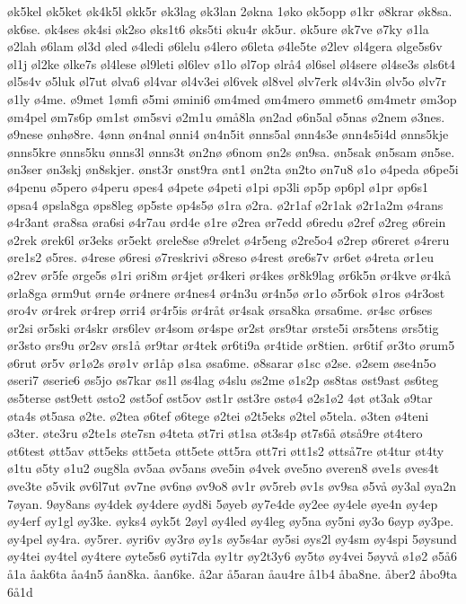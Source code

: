{øk5kel
øk5ket
øk4k5l
økk5r
øk3lag
øk3lan
2økna
1øko
øk5opp
ø1kr
ø8krar
øk8sa.
øk6se.
øk4ses
øk4si
øk2so
øks1t6
øks5ti
øku4r
øk5ur.
øk5ure
øk7ve
ø7ky
ø1la
ø2lah
ø6lam
øl3d
øled
ø4ledi
ø6lelu
ø4lero
ø6leta
ø4le5te
ø2lev
øl4gera
ølge5s6v
øl1j
øl2ke
ølke7s
øl4lese
øl9leti
øl6lev
ø1lo
øl7op
ølrå4
øl6sel
øl4sere
øl4se3s
øls6t4
øl5s4v
ø5luk
øl7ut
ølva6
øl4var
øl4v3ei
øl6vek
øl8vel
ølv7erk
øl4v3in
ølv5o
ølv7r
ø1ly
ø4me.
ø9met
1ømfi
ø5mi
ømini6
øm4med
øm4mero
ømmet6
øm4metr
øm3op
øm4pel
øm7s6p
øm1st
øm5svi
ø2m1u
ømå8la
øn2ad
ø6n5al
ø5nas
ø2nem
ø3nes.
ø9nese
ønhø8re.
4ønn
øn4nal
ønni4
øn4n5it
ønns5al
ønn4s3e
ønn4s5i4d
ønns5kje
ønns5kre
ønns5ku
ønns3l
ønns3t
øn2nø
ø6nom
øn2s
øn9sa.
øn5sak
øn5sam
øn5se.
øn3ser
øn3skj
øn8skjer.
ønst3r
ønst9ra
ønt1
øn2ta
øn2to
øn7u8
ø1o
ø4peda
ø6pe5i
ø4penu
ø5pero
ø4peru
øpes4
ø4pete
ø4peti
ø1pi
øp3li
øp5p
øp6pl
ø1pr
øp6s1
øpsa4
øpsla8ga
øps8leg
øp5ste
øp4s5ø
ø1ra
ø2ra.
ø2r1af
ø2r1ak
ø2r1a2m
ø4rans
ø4r3ant
øra8sa
øra6si
ø4r7au
ørd4e
ø1re
ø2rea
ør7edd
ø6redu
ø2ref
ø2reg
ø6rein
ø2rek
ørek6l
ør3eks
ør5ekt
ørele8se
ø9relet
ø4r5eng
ø2re5o4
ø2rep
ø6reret
ø4reru
øre1s2
ø5res.
ø4rese
ø6resi
ø7reskrivi
ø8reso
ø4rest
øre6s7v
ør6et
ø4reta
ør1eu
ø2rev
ør5fe
ørge5s
ø1ri
øri8m
ør4jet
ør4keri
ør4kes
ør8k9lag
ør6k5n
ør4kve
ør4kå
ørla8ga
ørm9ut
ørn4e
ør4nere
ør4nes4
ør4n3u
ør4n5ø
ør1o
ø5r6ok
ø1ros
ø4r3ost
øro4v
ør4rek
ør4rep
ørri4
ør4r5is
ør4råt
ør4sak
ørsa8ka
ørsa6me.
ør4sc
ør6ses
ør2si
ør5ski
ør4skr
ørs6lev
ør4som
ør4spe
ør2st
ørs9tar
ørste5i
ørs5tens
ørs5tig
ør3sto
ørs9u
ør2sv
ørs1å
ør9tar
ør4tek
ør6ti9a
ør4tide
ør8tien.
ør6tif
ør3to
ørum5
ø6rut
ør5v
ør1ø2s
ørø1v
ør1åp
ø1sa
øsa6me.
ø8sarar
ø1sc
ø2se.
ø2sem
øse4n5o
øseri7
øserie6
øs5jo
øs7kar
øs1l
øs4lag
ø4slu
øs2me
ø1s2p
øs8tas
øst9ast
øs6teg
øs5terse
øst9ett
østo2
øst5of
øst5ov
øst1r
øst3re
østø4
ø2s1ø2
4øt
øt3ak
ø9tar
øta4s
øt5asa
ø2te.
ø2tea
ø6tef
ø6tege
ø2tei
ø2t5eks
ø2tel
ø5tela.
ø3ten
ø4teni
ø3ter.
øte3ru
ø2te1s
øte7sn
ø4teta
øt7ri
øt1sa
øt3s4p
øt7s6å
øtså9re
øt4tero
øt6test
øtt5av
øtt5eks
øtt5eta
øtt5ete
øtt5ra
øtt7ri
øtt1s2
øttså7re
øt4tur
øt4ty
ø1tu
ø5ty
ø1u2
øug8la
øv5aa
øv5ans
øve5in
ø4vek
øve5no
øveren8
øve1s
øves4t
øve3te
ø5vik
øv6l7ut
øv7ne
øv6nø
øv9o8
øv1r
øv5reb
øv1s
øv9sa
ø5vå
øy3al
øya2n
7øyan.
9øy8ans
øy4dek
øy4dere
øyd8i
5øyeb
øy7e4de
øy2ee
øy4ele
øye4n
øy4ep
øy4erf
øy1gl
øy3ke.
øyks4
øyk5t
2øyl
øy4led
øy4leg
øy5na
øy5ni
øy3o
6øyp
øy3pe.
øy4pel
øy4ra.
øy5rer.
øyri6v
øy3rø
øy1s
øy5s4ar
øy5si
øys2l
øy4sm
øy4spi
5øysund
øy4tei
øy4tel
øy4tere
øyte5s6
øyti7da
øy1tr
øy2t3y6
øy5tø
øy4vei
5øyvå
ø1ø2
ø5å6
å1a
åak6ta
åa4n5
åan8ka.
åan6ke.
å2ar
å5aran
åau4re
å1b4
åba8ne.
åber2
åbo9ta
6å1d
}
